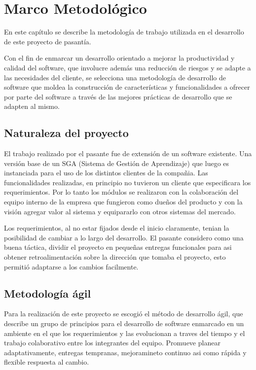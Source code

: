 \chapter{Marco Metodológico}
\thispagestyle{empty} %

En este capítulo se describe la metodología de trabajo utilizada en el desarrollo de este proyecto de pasantía.

Con el fin de enmarcar un desarrollo orientado a mejorar la productividad y calidad del software, que involucre además una reducción de riesgos y se adapte a las necesidades del cliente, se selecciona una metodología de desarrollo de software que moldea la construcción de características y funcionalidades a ofrecer por parte del software a través de las mejores prácticas de desarrollo que se adapten al mismo.

\section{Naturaleza del proyecto}
El trabajo realizado por el pasante fue de extensión de un software existente. Una versión base de un SGA (Sistema de Gestión de Aprendizaje) que luego es instanciada para el uso de los distintos clientes de la compañia. Las funcionalidades realizadas, en principio no tuvieron un cliente que especificara los requerimientos. Por lo tanto los módulos se realizaron con la colaboración del equipo interno de la empresa que fungieron como dueños del producto y con la visión agregar valor al sistema y equipararlo con otros sistemas del mercado.

Los requerimientos, al no estar fijados desde el inicio claramente, tenian la posibilidad de cambiar a lo largo del desarrollo. El pasante considero como una buena táctica, dividir el proyecto en pequeñas entregas funcionales para asi obtener retroalimentación sobre la dirección que tomaba el proyecto, esto permitió adaptarse a los cambios facilmente.

\section{Metodología ágil}

Para la realización de este proyecto se escogió el método de desarrollo ágil, que describe un grupo de principios para el desarrollo de software enmarcado en un ambiente en el que los requerimientos y las evolucionan a traves del tiempo y el trabajo colaborativo entre los integrantes del equipo. Promueve planear adaptativamente, entregas tempranas, mejoramineto continuo asi como rápida y flexible respuesta al cambio.

